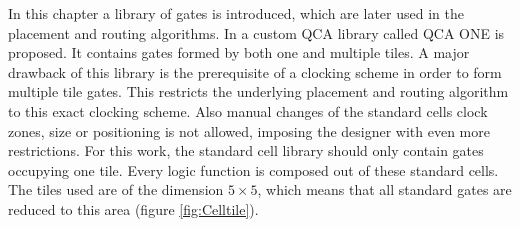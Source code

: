 In this chapter a library of gates is introduced, which are later used in the placement and routing algorithms. In \cite{QCA_scl} a custom QCA library called QCA ONE is proposed. It contains gates formed by both one and multiple tiles. A major drawback of this library is the prerequisite of a clocking scheme in order to form multiple tile gates. This restricts the underlying placement and routing algorithm to this exact clocking scheme. Also manual changes of the standard cells clock zones, size or positioning is not allowed, imposing the designer with even more restrictions. For this work, the standard cell library should only contain gates occupying one tile. Every logic function is composed out of these standard cells. The tiles used are of the dimension $5 \times 5$, which means that all standard gates are reduced to this area (figure \ref{fig:Celltile}).\\

